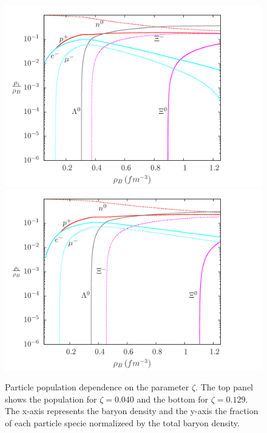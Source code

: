 \documentclass[twocolumn,showpacs,aps]{revtex4}
\begin{document}
\begin{figure}
\centering
\includegraphics[width=9.cm]{pop_paper_l0040_L97a32.png}
    \centering
  \includegraphics[width=9.cm]{pop_paper_l0129_L97a32.png}
    \caption{Particle population dependence on the parameter $\zeta$. The top panel shows the
    population for $\zeta=0.040$ and the bottom for $\zeta=0.129$. The x-axis represents the 
    baryon density and the y-axis the fraction of each particle specie 
    normalizeed by the total baryon density.}\label{pop_lambda}
 \end{figure}
\end{document}
